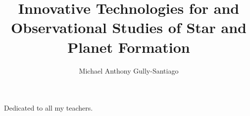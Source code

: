 \documentclass[12pt]{report}	%
\author{Michael Anthony Gully-Santiago}  	%
\title{Innovative Technologies for and Observational Studies of Star and Planet Formation}
\begin{document}
\copyrightpage          %


%
%
%
\commcertpage           %

\titlepage              %



%
\begin{dedication}
%
Dedicated to all my teachers.
\end{dedication}
\end{document}
